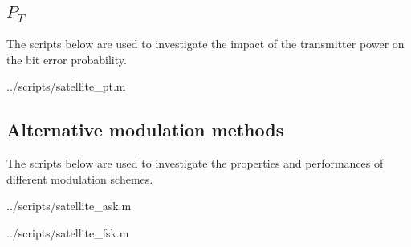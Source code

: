 \subsection{$P_T$}
The scripts below are used to investigate the impact of the transmitter power on the bit error probability.

\begin{lstinputlisting}[language=Octave]{../scripts/satellite_pt.m}
\end{lstinputlisting}


\subsection{Alternative modulation methods}
The scripts below are used to investigate the properties and performances of different modulation schemes.

\begin{lstinputlisting}[language=Octave]{../scripts/satellite_ask.m}
\end{lstinputlisting}

\begin{lstinputlisting}[language=Octave]{../scripts/satellite_fsk.m}
\end{lstinputlisting}
